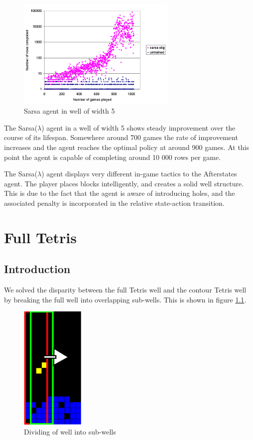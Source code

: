 \documentclass{rucsthesis}
\begin{document}
\begin{figure}[h]
\centering
\includegraphics[width=3in]{sarsaeligredtet5well.png}
\caption{Sarsa agent in well of width 5}
\label{fig:sarsaeligredtet5well}
\end{figure}

The Sarsa($\lambda$) agent in a well of width 5 shows steady improvement over the course of its lifespan. Somewhere around 700 games the rate of improvement increases and the agent reaches the optimal policy at around 900 games. At this point the agent is capable of completing around 10 000 rows per game.

The Sarsa($\lambda$) agent displays very different in-game tactics to the Afterstates agent. The player places blocks intelligently, and creates a solid well structure. This is due to the fact that the agent is aware of introducing holes, and the associated penalty is incorporated in the relative state-action transition. 

\chapter{Full Tetris}

\section{Introduction}

We solved the disparity between the full Tetris well and the contour Tetris well by breaking the full well into overlapping sub-wells. This is shown in figure \ref{fig:subwells}.

\begin{figure}[h]
\centering
\includegraphics[width=1.2in]{decomposedwell.png}
\caption{Dividing of well into sub-wells}
\label{fig:subwells}
\end{figure}
\end{document}
